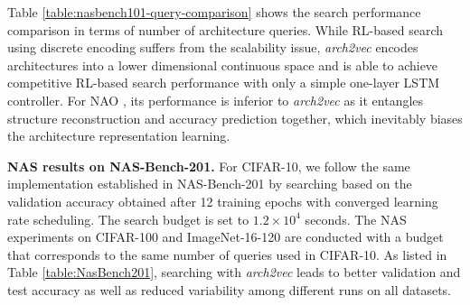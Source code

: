 Table \ref{table:nasbench101-query-comparison} shows the search performance comparison in terms of number of architecture queries. While RL-based search using discrete encoding suffers from the scalability issue, \textit{arch2vec} encodes architectures into a lower dimensional continuous space and is able to achieve competitive RL-based search performance with only a simple one-layer LSTM controller. For NAO \cite{NAO}, its performance is inferior to \textit{arch2vec} as it entangles structure reconstruction and accuracy prediction together, which inevitably biases the architecture representation learning.


\vspace{1mm}
\textbf{NAS results on NAS-Bench-201.}
For CIFAR-10, we follow the same implementation established in NAS-Bench-201 by searching based on the validation accuracy obtained after 12 training epochs with converged learning rate scheduling. The search budget is set to $1.2\times10^4$ seconds. The NAS experiments on CIFAR-100 and ImageNet-16-120 are conducted with a budget that corresponds to the same number of queries used in CIFAR-10. 
As listed in Table \ref{table:NasBench201}, searching with \textit{arch2vec} leads to better validation and test accuracy as well as reduced variability among different runs on all datasets.

